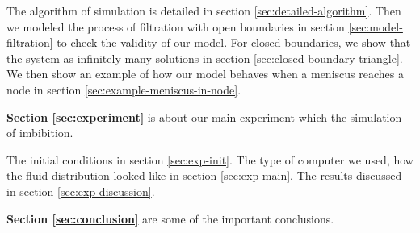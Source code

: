 	The algorithm of simulation is detailed in section \ref{sec:detailed-algorithm}. Then we modeled the process of filtration with open boundaries in section \ref{sec:model-filtration} to check the validity of our model. For closed boundaries, we show that the system as infinitely many solutions in section \ref{sec:closed-boundary-triangle}. We then show an example of how our model behaves when a meniscus reaches a node in section \ref{sec:example-meniscus-in-node}.
	
	\textbf{Section \ref{sec:experiment}} is about our main experiment which the simulation of imbibition.
	
	The initial conditions in section \ref{sec:exp-init}. The type of computer we used, how the fluid distribution looked like in section \ref{sec:exp-main}. The results discussed in section \ref{sec:exp-discussion}.
	
	\textbf{Section \ref{sec:conclusion}} are some of the important conclusions.
	
	
	
	

	
	
